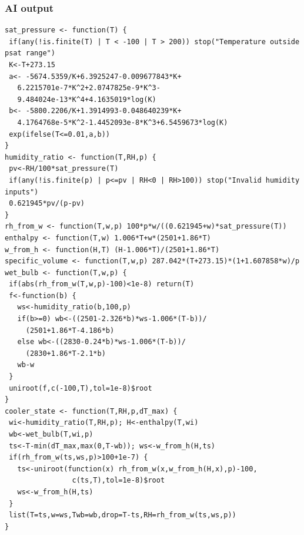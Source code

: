 \subsubsection*{AI output}
\begin{lstlisting}[style=Rcode]
sat_pressure <- function(T) {
 if(any(!is.finite(T) | T < -100 | T > 200)) stop("Temperature outside psat range")
 K<-T+273.15
 a<- -5674.5359/K+6.3925247-0.009677843*K+
   6.2215701e-7*K^2+2.0747825e-9*K^3-
   9.484024e-13*K^4+4.1635019*log(K)
 b<- -5800.2206/K+1.3914993-0.048640239*K+
   4.1764768e-5*K^2-1.4452093e-8*K^3+6.5459673*log(K)
 exp(ifelse(T<=0.01,a,b))
}
humidity_ratio <- function(T,RH,p) {
 pv<-RH/100*sat_pressure(T)
 if(any(!is.finite(p) | p<=pv | RH<0 | RH>100)) stop("Invalid humidity inputs")
 0.621945*pv/(p-pv)
}
rh_from_w <- function(T,w,p) 100*p*w/((0.621945+w)*sat_pressure(T))
enthalpy <- function(T,w) 1.006*T+w*(2501+1.86*T)
w_from_h <- function(H,T) (H-1.006*T)/(2501+1.86*T)
specific_volume <- function(T,w,p) 287.042*(T+273.15)*(1+1.607858*w)/p
wet_bulb <- function(T,w,p) {
 if(abs(rh_from_w(T,w,p)-100)<1e-8) return(T)
 f<-function(b) {
   ws<-humidity_ratio(b,100,p)
   if(b>=0) wb<-((2501-2.326*b)*ws-1.006*(T-b))/
     (2501+1.86*T-4.186*b)
   else wb<-((2830-0.24*b)*ws-1.006*(T-b))/
     (2830+1.86*T-2.1*b)
   wb-w
 }
 uniroot(f,c(-100,T),tol=1e-8)$root
}
cooler_state <- function(T,RH,p,dT_max) {
 wi<-humidity_ratio(T,RH,p); H<-enthalpy(T,wi)
 wb<-wet_bulb(T,wi,p)
 ts<-T-min(dT_max,max(0,T-wb)); ws<-w_from_h(H,ts)
 if(rh_from_w(ts,ws,p)>100+1e-7) {
   ts<-uniroot(function(x) rh_from_w(x,w_from_h(H,x),p)-100,
                c(ts,T),tol=1e-8)$root
   ws<-w_from_h(H,ts)
 }
 list(T=ts,w=ws,Twb=wb,drop=T-ts,RH=rh_from_w(ts,ws,p))
}
\end{lstlisting}
